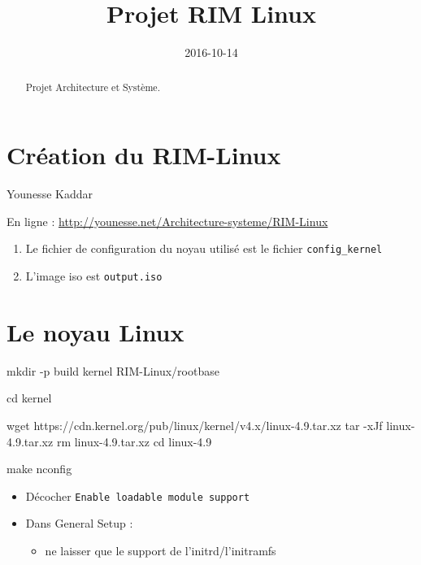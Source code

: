\documentclass[]{article}
\title{Projet RIM Linux}
\date{2016-10-14}
\newenvironment{Shaded}{}{}
\newcommand{\FunctionTok}[1]{\textcolor[rgb]{0.02,0.16,0.49}{{#1}}}
\newcommand{\BuiltInTok}[1]{{#1}}
\newcommand{\NormalTok}[1]{{#1}}
\providecommand{\tightlist}{%
  \setlength{\itemsep}{0pt}\setlength{\parskip}{0pt}}
\begin{document}
\maketitle
\begin{abstract}
Projet Architecture et Système.
\end{abstract}

\section{Création du RIM-Linux}\label{cruxe9ation-du-rim-linux}

Younesse Kaddar

En ligne : \url{http://younesse.net/Architecture-systeme/RIM-Linux}

\begin{enumerate}
\def\labelenumi{\arabic{enumi}.}
\item
  Le fichier de configuration du noyau utilisé est le fichier
  \texttt{config\_kernel}
\item
  L'image iso est \texttt{output.iso}
\end{enumerate}

\section{Le noyau Linux}\label{le-noyau-linux}

\begin{Shaded}
\begin{Highlighting}[]
\FunctionTok{mkdir} \NormalTok{-p build kernel RIM-Linux/rootbase}

\BuiltInTok{cd} \NormalTok{kernel}

\FunctionTok{wget} \NormalTok{https://cdn.kernel.org/pub/linux/kernel/v4.x/linux-4.9.tar.xz}
\FunctionTok{tar} \NormalTok{-xJf linux-4.9.tar.xz}
\FunctionTok{rm} \NormalTok{linux-4.9.tar.xz}
\BuiltInTok{cd} \NormalTok{linux-4.9}

\FunctionTok{make} \NormalTok{nconfig}
\end{Highlighting}
\end{Shaded}

\begin{itemize}
\item
  Décocher \texttt{Enable\ loadable\ module\ support}
\item
  Dans General Setup :

  \begin{itemize}
  \tightlist
  \item
    ne laisser que le support de l'initrd/l'initramfs
  \end{itemize}
\end{itemize}
\end{document}
